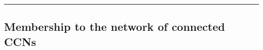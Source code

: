 \documentclass[crop]{CSLB}
\newcommand{\cetis}{CCNs}
\begin{document}







 
       



\rule{8cm}{12pt} \bigskip
  





\subsection{Membership to the network of connected \cetis{}}\label{SS_members}
\end{document}
